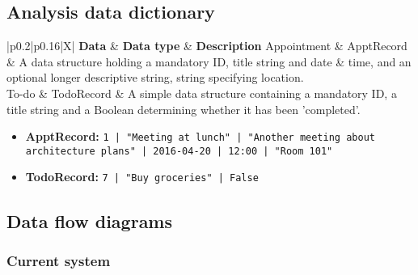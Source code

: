\subsection{Analysis data dictionary}

\newcommand{\dictline}[1]{#1 \\ \hline}
\begin{table}[H]
    \centering
    \begin{tabularx}{\linewidth}{|p{0.2\linewidth}|p{0.16\linewidth}|X|} \hline
        \textbf{Data} & \textbf{Data type} &
        \textbf{Description} \R
        \dictline{Appointment & ApptRecord
          & A data structure holding a mandatory ID, title string and date \&
          time, and an optional longer descriptive string, string specifying
          location.}
        \dictline{To-do & TodoRecord
          & A simple data structure containing a mandatory ID, a title string
          and a Boolean determining whether it has been 'completed'.}
    \end{tabularx}
    \caption{The analysis data dictionary.}
    \label{tbl:add}
\end{table}

\begin{itemize}
    \item \textbf{ApptRecord:}
    \texttt{1 | "Meeting at lunch" | "Another meeting about architecture plans"
    | 2016-04-20 | 12:00 | "Room 101"}
    \item \textbf{TodoRecord:}
    \texttt{7 | "Buy groceries" | False}
\end{itemize}

\subsection{Data flow diagrams}
\subsubsection{Current system}

\newcommand{\addfigure}[3]{
    \begin{figure}[H]
        \centering
        \texttt{[image: \#1]}
        \caption{#2}
        \label{#3}
    \end{figure}
}

